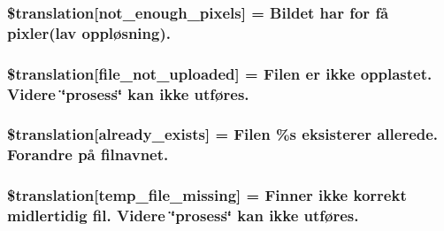 \subsubsection[{\$translation}]{\setlength{\rightskip}{0pt plus 5cm}\$translation\mbox{[}\textquotesingle{}not\+\_\+enough\+\_\+pixels\textquotesingle{}\mbox{]} = \textquotesingle{}Bildet har for få pixler(lav oppløsning).\textquotesingle{}}\label{class_8upload_8no___n_o_8php_a1fe342c27ce61f4ff4e0120ba647033e}
\hypertarget{class_8upload_8no___n_o_8php_a4ce76e7be0b3a03c2b47f6d70c21832e}{}
\subsubsection[{\$translation}]{\setlength{\rightskip}{0pt plus 5cm}\$translation\mbox{[}\textquotesingle{}file\+\_\+not\+\_\+uploaded\textquotesingle{}\mbox{]} = \textquotesingle{}Filen er ikke opplastet. Videre \char`\"{}prosess\char`\"{} kan ikke utføres.\textquotesingle{}}\label{class_8upload_8no___n_o_8php_a4ce76e7be0b3a03c2b47f6d70c21832e}
\hypertarget{class_8upload_8no___n_o_8php_afd84e910217f04139f567c41e292afa5}{}
\subsubsection[{\$translation}]{\setlength{\rightskip}{0pt plus 5cm}\$translation\mbox{[}\textquotesingle{}already\+\_\+exists\textquotesingle{}\mbox{]} = \textquotesingle{}Filen \%s eksisterer allerede. Forandre på filnavnet.\textquotesingle{}}\label{class_8upload_8no___n_o_8php_afd84e910217f04139f567c41e292afa5}
\hypertarget{class_8upload_8no___n_o_8php_ab0fa87a88aba2624004581eed0633325}{}
\subsubsection[{\$translation}]{\setlength{\rightskip}{0pt plus 5cm}\$translation\mbox{[}\textquotesingle{}temp\+\_\+file\+\_\+missing\textquotesingle{}\mbox{]} = \textquotesingle{}Finner ikke korrekt midlertidig fil. Videre \char`\"{}prosess\char`\"{} kan ikke utføres.\textquotesingle{}}\label{class_8upload_8no___n_o_8php_ab0fa87a88aba2624004581eed0633325}
\hypertarget{class_8upload_8no___n_o_8php_aceaaf7355acaaf10f0ae60378d03c468}{}
